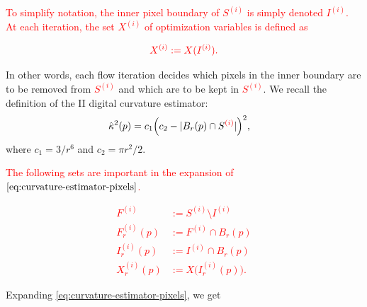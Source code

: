 \documentclass[smallextended]{svjour3}       %
\newcommand{\revision}[1]{\textcolor{red}{#1}}
\begin{document}
\revision{To simplify notation, the inner pixel boundary of $S^{(i)}$ is simply denoted $I^{(i)}$. At each iteration, the set $X^{(i)}$ of optimization variables is defined as}

\begin{align*}
\revision{
	X^{(i)} := X(I^{(i)}).
}
\end{align*}


In other words, each flow iteration decides which pixels in the inner boundary are to be removed from \revision{$S^{(i)}$} and which are to be kept in \revision{$S^{(i)}$}. We recall the definition of the II digital curvature estimator:
\begin{align}
	\hat{\kappa}^2(p) &= c_1\Big( c_2 - | B_r(p) \cap S^{\revision{(i)}} | \Big)^2, 
	\label{eq:curvature-estimator-pixels}
\end{align}
where $c_1=3/r^6$ and $c_2=\pi r^2/2$. 

\revision{The following sets are important in the expansion of $\eqref{eq:curvature-estimator-pixels}$.}

\revision{
\begin{align*}
	F^{(i)} &:= S^{(i)} \setminus I^{(i)} \\
	F_r^{(i)}(p) &:= F^{(i)} \cap B_r(p)\\
	I_r^{(i)}(p) &:= I^{(i)} \cap B_r(p) \\
	X_r^{(i)}(p) &:= X\big( I_r^{(i)}(p) \big).
\end{align*}
}

Expanding \eqref{eq:curvature-estimator-pixels}, we get 
\end{document}
